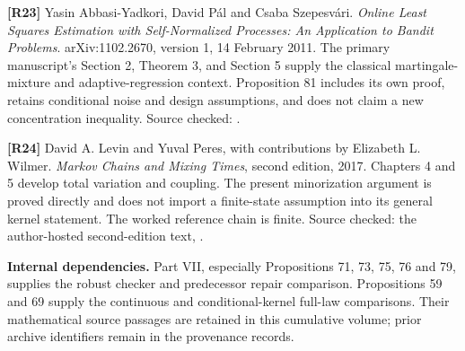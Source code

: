 \documentclass[11pt,letterpaper]{article}
\begin{document}
\textbf{{[}R23{]}} Yasin Abbasi-Yadkori, David Pál and Csaba Szepesvári.
\emph{Online Least Squares Estimation with Self-Normalized Processes: An
Application to Bandit Problems}. arXiv:1102.2670, version 1, 14 February
2011. The primary manuscript's Section 2, Theorem 3, and Section 5
supply the classical martingale-mixture and adaptive-regression context.
Proposition 81 includes its own proof, retains conditional noise and
design assumptions, and does not claim a new concentration inequality.
Source checked: .

\textbf{{[}R24{]}} David A. Levin and Yuval Peres, with contributions by
Elizabeth L. Wilmer. \emph{Markov Chains and Mixing Times}, second
edition, 2017. Chapters 4 and 5 develop total variation and coupling.
The present minorization argument is proved directly and does not import
a finite-state assumption into its general kernel statement. The worked
reference chain is finite. Source checked: the author-hosted
second-edition text,
.

\textbf{Internal dependencies.} Part VII, especially Propositions 71,
73, 75, 76 and 79, supplies the robust checker and predecessor repair
comparison. Propositions 59 and 69 supply the continuous and
conditional-kernel full-law comparisons. Their mathematical source
passages are retained in this cumulative volume; prior archive
identifiers remain in the provenance records.

\endgroup
\end{document}
